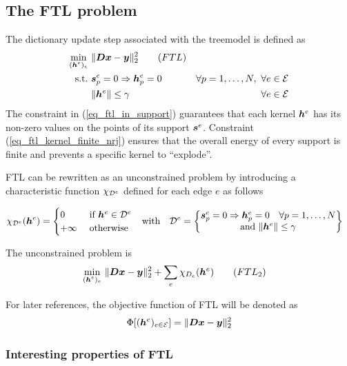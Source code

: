 \subsection{The \acs{FTL} problem}

The dictionary update step associated with the \gls{treemodel} is defined as
\begin{align}
\underset{\substack{(\bm{h}^e)_{e}}}\min ~ & \lVert \bm{D}\bm{x} - \bm{y} \rVert_2^2 \tag{$FTL$} \label{eq_ftl}\\
\text{s.t.~} & \bm{s}^e_p=0 \Rightarrow \bm{h}^e_p = 0 \quad & \forall p=1,\dots,N ,~\forall e \in \mathcal E \label{eq_ftl_in_support} \\
 & \lVert \bm{h}^e \rVert \le \gamma & \forall e \in \mathcal E\label{eq_ftl_kernel_finite_nrj}
\end{align} The constraint in (\ref{eq_ftl_in_support}) guarantees that each kernel $\bm{h}^e$ has its non-zero values on the points of its support $\bm{s}^e$. Constraint (\ref{eq_ftl_kernel_finite_nrj}) ensures that the overall energy of every support is finite and prevents a specific kernel to “explode”.

\ac{FTL} can be rewritten as an unconstrained problem by introducing a characteristic function $\chi_{{\mathcal D}^e}$ defined for each edge $e$ as follows

\begin{align*}
	\chi_{{\mathcal D}^e}(\bm{h}^e) = \begin{cases} 0 &\text{ if } \bm{h}^e \in {\mathcal D}^e \\ +\infty & \ \text{otherwise}\end{cases} & \quad \text{with} \quad {\mathcal D}^e = \begin{Bmatrix} \bm{s}^e_p=0 \Rightarrow \bm{h}^e_p = 0 \quad \forall p=1,\dots,N\\ \text{and }\lVert \bm{h}^e \rVert \le \gamma \end{Bmatrix}
\end{align*}

The unconstrained problem is
\begin{align}
\underset{\substack{(\h^e)_{e}}}\min ~ & \lVert \D\x - \y \rVert_2^2 + \sum_{e}\chi_{D_e} (\h^e) \tag{${FTL}_2$} \label{eq_ftl2}
\end{align}

For later references, the objective function of \ac{FTL} will be denoted as
\begin{align}
\Phi[(\bm{h}^e)_{e \in \mathcal E}] = \lVert \bm{D}\bm{x}-\bm{y} \rVert^2_2
\end{align}

\subsubsection{Interesting properties of \ac{FTL}}

